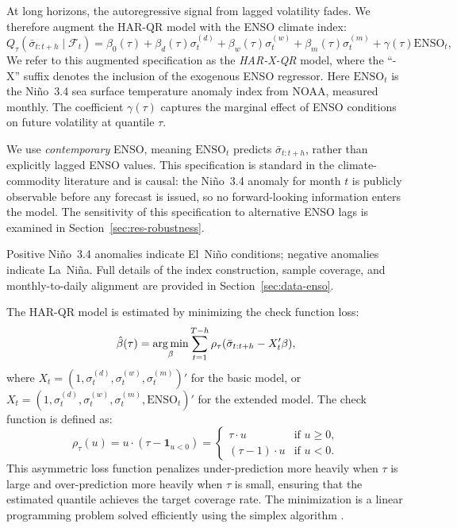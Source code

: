 At long horizons, the autoregressive signal from lagged volatility fades.
We therefore augment the HAR-QR model with the ENSO climate index:
\begin{equation}
\label{eq:har-x-qr}
Q_{\tau}(\bar{\sigma}_{t:t+h} \mid \mathcal{F}_t) = \beta_0(\tau) + \beta_d(\tau) \sigma_t^{(d)} + \beta_w(\tau) \sigma_t^{(w)} + \beta_m(\tau) \sigma_t^{(m)} + \gamma(\tau) \text{ENSO}_t,
\end{equation}
We refer to this augmented specification as the \emph{HAR-X-QR} model,
where the ``-X'' suffix denotes the inclusion of the exogenous ENSO regressor.
Here $\text{ENSO}_t$ is the Ni\~no~3.4 sea surface temperature anomaly
index from NOAA, measured monthly. The coefficient $\gamma(\tau)$ captures
the marginal effect of ENSO conditions on future volatility at quantile
$\tau$.

We use \emph{contemporary} ENSO, meaning $\text{ENSO}_t$ predicts
$\bar{\sigma}_{t:t+h}$, rather than explicitly lagged ENSO values. This
specification is standard in the climate-commodity literature
\parencite{bouriNinoForecastabilityOilprice2021,
bonatoNinoNinaForecastability2023} and is causal: the Ni\~no~3.4
anomaly for month $t$ is publicly observable before any forecast is issued,
so no forward-looking information enters the model. The sensitivity of this
specification to alternative ENSO lags is examined in
Section~\ref{sec:res-robustness}.

Positive Ni\~no~3.4 anomalies indicate El~Ni\~no conditions; negative
anomalies indicate La~Ni\~na. Full details of the index construction,
sample coverage, and monthly-to-daily alignment are provided in
Section~\ref{sec:data-enso}.

The HAR-QR model is estimated by minimizing the check function loss:
\begin{equation}
\label{eq:har-qr-estimation}
\hat{\beta}(\tau) = \operatorname*{arg\,min}_{\beta} \sum_{t=1}^{T-h} \rho_{\tau}(\bar{\sigma}_{t:t+h} - X_t' \beta),
\end{equation}
where $X_t = (1, \sigma_t^{(d)}, \sigma_t^{(w)}, \sigma_t^{(m)})'$ for the
basic model, or
$X_t = (1, \sigma_t^{(d)}, \sigma_t^{(w)}, \sigma_t^{(m)}, \text{ENSO}_t)'$
for the extended model. The check function is defined as:
\begin{equation}
\label{eq:check-function}
\rho_{\tau}(u) = u \cdot (\tau - \mathbf{1}_{u < 0}) =
\begin{cases}
\tau \cdot u & \text{if } u \geq 0, \\
(\tau - 1) \cdot u & \text{if } u < 0.
\end{cases}
\end{equation}
This asymmetric loss function penalizes under-prediction more heavily when
$\tau$ is large and over-prediction more heavily when $\tau$ is small,
ensuring that the estimated quantile achieves the target coverage rate. The
minimization is a linear programming problem solved efficiently using the
simplex algorithm \parencite{koenker1987algorithm}.

